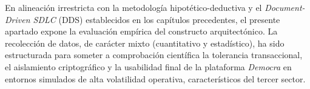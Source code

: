 En alineaci\'on irrestricta con la metodolog\'ia hipot\'etico-deductiva y el \textit{Document-Driven SDLC} (DDS) establecidos en los cap\'itulos precedentes, el presente apartado expone la evaluaci\'on emp\'irica del constructo arquitect\'onico. La recolecci\'on de datos, de car\'acter mixto (cuantitativo y estad\'istico), ha sido estructurada para someter a comprobaci\'on cient\'ifica la tolerancia transaccional, el aislamiento criptogr\'afico y la usabilidad final de la plataforma \textit{Democra} en entornos simulados de alta volatilidad operativa, caracter\'isticos del tercer sector.
